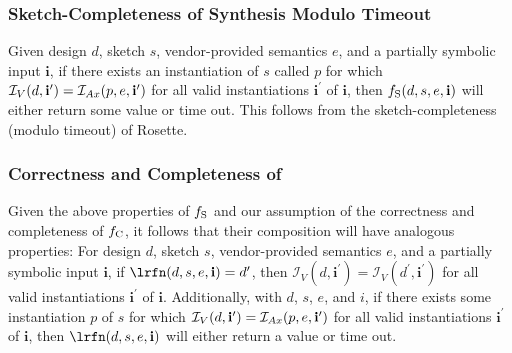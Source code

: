 \subsubsection{Sketch-Completeness of Synthesis Modulo Timeout}

Given design $d$,
  sketch $s$,
  vendor-provided semantics $e$,
  and a partially symbolic input $\mathbf{i}$,
  if there exists an instantiation of $s$ called $p$ for which $\mathcal{I}_V(d, \mathbf{i}^\prime) = \mathcal{I}_{Ax}(p, e, \mathbf{i}^\prime)$ 
  for all
  valid instantiations $\mathbf{i}^\prime$ of $\mathbf{i}$, 
  then $f_{\text{S}{}}(d, s, e, \mathbf{i})$ 
  will either return some value or time out.
This follows from the sketch-completeness (modulo timeout) of Rosette.

\subsubsection{Correctness and Completeness of \lrfn{}}

Given the above properties of $f_{\text{S}{}}$
  and our assumption of the correctness and completeness of $f_{\text{C}{}}$,
  it follows that their composition will have analogous properties:
For design $d$,
  sketch $s$,
  vendor-provided semantics $e$,
  and a partially symbolic input $\mathbf{i}$,
  if $\lrfn(d, s, e, \mathbf{i}) = d^\prime$, then $\mathcal{I}_V(d, \mathbf{i}^\prime) = \mathcal{I}_V(d^\prime, \mathbf{i}^\prime)$ for all valid instantiations $\mathbf{i}^\prime$ of $\mathbf{i}$.
Additionally, with $d$, $s$, $e$, and $i$,
  if there exists some instantiation $p$ of $s$ for which
  $\mathcal{I}_V(d, \mathbf{i}^\prime) = \mathcal{I}_{Ax}(p, e, \mathbf{i}^\prime)$ 
  for all
  valid instantiations $\mathbf{i}^\prime$ of $\mathbf{i}$,
  then $\lrfn(d, s, e, \mathbf{i})$
  will either return a value or time out.




